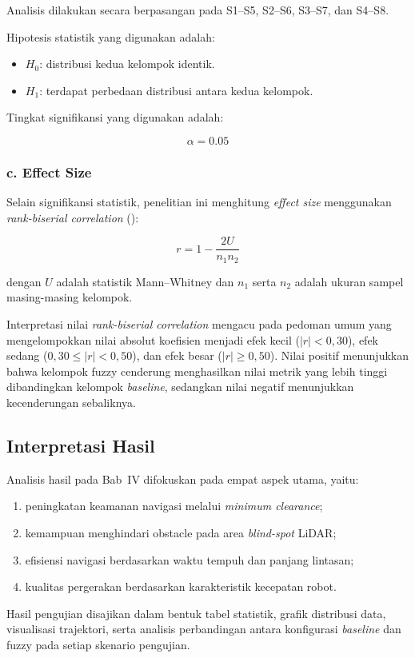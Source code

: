 Analisis dilakukan secara berpasangan pada S1--S5, S2--S6, S3--S7, dan S4--S8.

Hipotesis statistik yang digunakan adalah:

\begin{itemize}
\item $H_0$: distribusi kedua kelompok identik.
\item $H_1$: terdapat perbedaan distribusi antara kedua kelompok.
\end{itemize}

Tingkat signifikansi yang digunakan adalah:

\begin{equation}
\alpha = 0.05
\end{equation}

\subsubsection*{c. Effect Size}

Selain signifikansi statistik, penelitian ini menghitung \textit{effect size} menggunakan \textit{rank-bise\-rial correlation} (\cite{Kerby2014}):

\begin{equation}
r
=
1 - \frac{2U}{n_1 n_2}
\label{eq:rank_biserial}
\end{equation}

dengan $U$ adalah statistik Mann--Whitney dan $n_1$ serta $n_2$ adalah ukuran sampel masing-masing kelompok.

Interpretasi nilai \textit{rank-biserial correlation} mengacu pada pedoman umum yang mengelompokkan nilai absolut koefisien menjadi efek kecil ($|r| < 0{,}30$), efek sedang ($0{,}30 \leq |r| < 0{,}50$), dan efek besar ($|r| \geq 0{,}50$). Nilai positif menunjukkan bahwa kelompok fuzzy cenderung menghasilkan nilai metrik yang lebih tinggi dibandingkan kelompok \textit{baseline}, sedangkan nilai negatif menunjukkan kecenderungan sebaliknya.

\subsection{Interpretasi Hasil}

Analisis hasil pada Bab~IV difokuskan pada empat aspek utama, yaitu:

\begin{enumerate}
\item peningkatan keamanan navigasi melalui \textit{minimum clearance};
\item kemampuan menghindari obstacle pada area \textit{blind-spot} LiDAR;
\item efisiensi navigasi berdasarkan waktu tempuh dan panjang lintasan;
\item kualitas pergerakan berdasarkan karakteristik kecepatan robot.
\end{enumerate}

Hasil pengujian disajikan dalam bentuk tabel statistik, grafik distribusi data, visualisasi trajektori, serta analisis perbandingan antara konfigurasi \textit{baseline} dan fuzzy pada setiap skenario pengujian.
